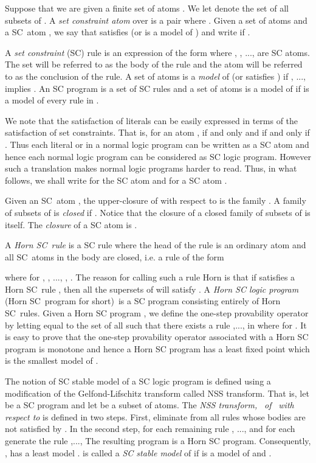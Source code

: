 \documentclass[letterpaper]{article}\usepackage{aaai}
\begin{document}
Suppose that we are given a finite set of atoms . We let  denote the set of all subsets of . A \emph{set
constraint atom} over  is a pair  where
. Given a set of atoms  and a
SC\ atom , we say that  satisfies
 (or  is a model of ) and write  if
.

A \emph{set constraint} (SC) rule  is an expression of the form
where , , ...,  are SC atoms. The set  will be referred to as the body of the
rule  and the atom  will be referred to as the
conclusion of the rule. A set of atoms  is a \emph{model} of  (or 
satisfies ) if , ...,  implies . An SC program  is a set of SC rules and a set of atoms  is a model of
 if  is a model of every rule in .

We note that the satisfaction of literals can be easily expressed in terms of
the satisfaction of set constraints. That is, for an atom , 
if and only  and  if and only if
. Thus each literal  or  in a normal logic program
can be written as a SC atom and hence each normal logic program can be
considered as SC logic program. However such a translation makes normal logic
programs harder to read. Thus, in what follows, we shall write  for the SC
atom  and  for a SC atom .

Given an SC\ atom , the upper-closure
 of  with respect to  is the family  . A family  of subsets of  is \emph{closed} if
. Notice that the closure of a closed family  of subsets of
 is  itself. The \emph{closure} of a SC atom  is .

A \emph{Horn SC\ rule} is a SC rule where the head of the rule is an ordinary
atom and all SC\ atoms in the body are closed, i.e. a rule of the form

where for , , ..., , . The reason for
calling such a rule Horn is that if  satisfies a Horn SC\ rule , then
all the supersets of  will satisfy . A \emph{Horn SC logic program}
(Horn SC\ program for short)\ is a SC program consisting entirely of Horn
SC\ rules. Given a Horn SC program , we define the one-step provability
operator  by letting  equal to the set of all  such that
there exists a rule ,..., in  where  for . It is easy to prove that the one-step
provability operator associated with a Horn SC program is monotone and hence a
Horn SC program  has a least fixed point which is the smallest model of .

The notion of SC stable model of a SC logic program is defined using a
modification of the Gelfond-Lifschitz transform called NSS transform. That is,
let  be a SC program and let  be a subset of atoms. The \emph{NSS
transform, }\emph{\ of }\emph{\ with respect to
} is defined in two steps. First, eliminate from  all rules whose
bodies are not satisfied by . In the second step, for each remaining rule
, ...,  and for each 
generate the rule ,...,  The resulting
program  is a Horn SC program. Consequently, ,
 has a least model .  is called a \emph{SC stable model} of
 if  is a model of  and .
\end{document}
